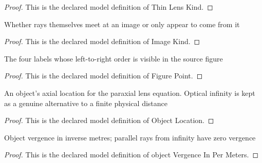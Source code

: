 \begin{proof}
  This is the declared model definition of Thin Lens Kind.
\end{proof}
\begin{definition}
  \label{def:physics:phyx-mini-0130:phyxminiproblems-problemphyxmini0130-imagekind}
  Whether rays themselves meet at an image or only appear to come from it
\end{definition}
\begin{proof}
  This is the declared model definition of Image Kind.
\end{proof}
\begin{definition}
  \label{def:physics:phyx-mini-0130:phyxminiproblems-problemphyxmini0130-figurepoint}
  The four labels whose left-to-right order is visible in the source figure
\end{definition}
\begin{proof}
  This is the declared model definition of Figure Point.
\end{proof}
\begin{definition}
  \label{def:physics:phyx-mini-0130:phyxminiproblems-problemphyxmini0130-objectlocation}
  An object's axial location for the paraxial lens equation. Optical infinity is kept as a genuine alternative to a finite physical distance
\end{definition}
\begin{proof}
  This is the declared model definition of Object Location.
\end{proof}
\begin{definition}
  \label{def:physics:phyx-mini-0130:phyxminiproblems-problemphyxmini0130-objectvergenceinpermeters}
  Object vergence in inverse metres; parallel rays from infinity have zero vergence
\end{definition}
\begin{proof}
  This is the declared model definition of object Vergence In Per Meters.
\end{proof}
